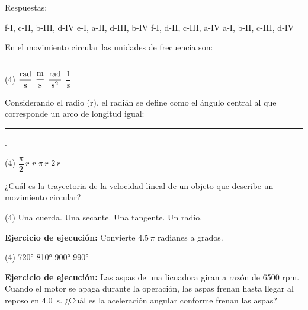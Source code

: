 \documentclass[12pt, letter]{exam}
\begin{document}
\begin{questions}
\begin{multicols}{2}
    \end{multicols}
    
    \vspace*{0.25cm}
    Respuestas:
    \begin{multicols}{2}
    \begin{tasks}
        \task f-I, c-II, b-III, d-IV
        \task e-I, a-II, d-III, b-IV
        \task f-I, d-II, c-III, a-IV
        \task a-I, b-II, c-III, d-IV
    \end{tasks}
    \end{multicols}
    \question En el movimiento circular las unidades de frecuencia son: \rule{2cm}{0.1mm}
    \begin{tasks}(4)
        \task $\displaystyle \unit[per-mode=fraction]{\radian\per\second}$
        \task $\displaystyle \unit[per-mode=fraction]{\meter\per\second}$
        \task $\displaystyle \unit[per-mode=fraction]{\radian\per\square\second}$
        \task $\dfrac{1}{\unit{\second}}$
    \end{tasks}
    \question Considerando el radio (r), el radián se define como el ángulo central al que corresponde un arco de longitud igual: \rule{2cm}{0.1mm}.
    \begin{tasks}(4)
        \task $\dfrac{\pi}{2} \, r$
        \task $r$
        \task $\pi \, r$
        \task $2 \, r$
    \end{tasks}
    \question ¿Cuál es la trayectoria de la velocidad lineal de un objeto que describe un movimiento circular?
    \begin{tasks}(4)
        \task Una cuerda.
        \task Una secante.
        \task Una tangente.
        \task Un radio.
    \end{tasks}
    \question \label{Ejercicio_01} \textbf{Ejercicio de ejecución: } Convierte $4.5 \, \pi$ radianes a grados.
    \begin{tasks}(4)
        \task \ang{720}
        \task \ang{810}
        \task \ang{900}
        \task \ang{990}
    \end{tasks}
    \question \label{Ejercicio_02} \textbf{Ejercicio de ejecución: } Las aspas de una licuadora giran a razón de \num{6500} rpm. Cuando el motor se apaga durante la operación, las aspas frenan hasta llegar al reposo en \SI{4.0}{\second}. ¿Cuál es la aceleración angular conforme frenan las aspas?

\end{questions}
\end{document}
